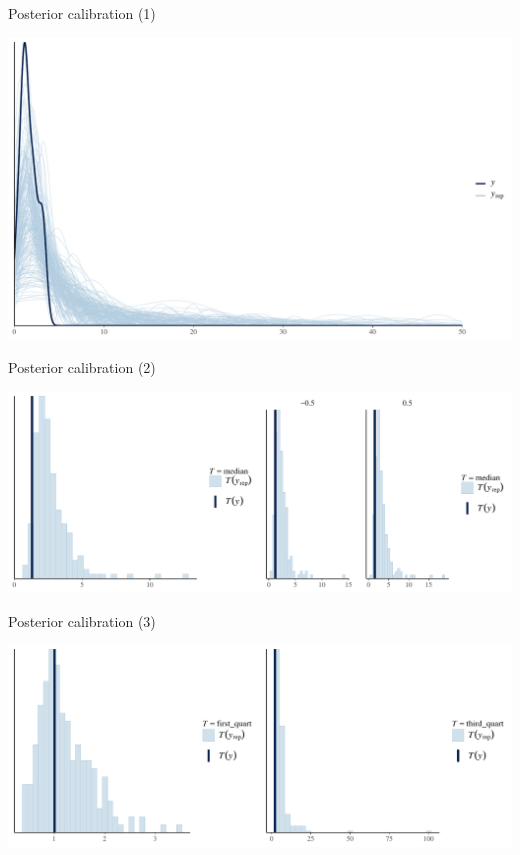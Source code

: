 \documentclass[ignorenonframetext,a4paper]{beamer}
\begin{document}
\begin{frame}{Posterior calibration (1)}

\includegraphics{DB_presentation_case_study_files/figure-beamer/unnamed-chunk-14-1.pdf}

\end{frame}

\begin{frame}{Posterior calibration (2)}

\includegraphics{DB_presentation_case_study_files/figure-beamer/unnamed-chunk-15-1.pdf}

\end{frame}

\begin{frame}{Posterior calibration (3)}

\includegraphics{DB_presentation_case_study_files/figure-beamer/unnamed-chunk-16-1.pdf}

\end{frame}
\end{document}
